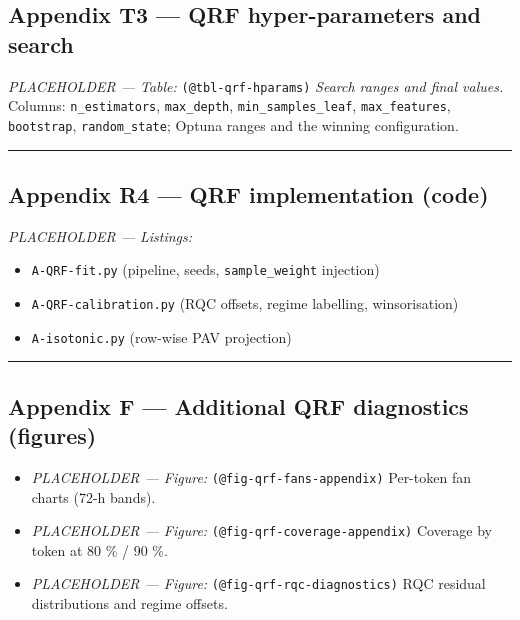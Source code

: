 \documentclass[
  a4paper,
  DIV=11,
  numbers=noendperiod]{scrreprt}
\providecommand{\tightlist}{%
  \setlength{\itemsep}{0pt}\setlength{\parskip}{0pt}}
\begin{document}
\subsection{Appendix T3 --- QRF hyper-parameters and
search}\label{app-t3-qrf-hparams}

\emph{PLACEHOLDER --- Table:} \texttt{(@tbl-qrf-hparams)} \emph{Search
ranges and final values.} Columns: \texttt{n\_estimators},
\texttt{max\_depth}, \texttt{min\_samples\_leaf},
\texttt{max\_features}, \texttt{bootstrap}, \texttt{random\_state};
Optuna ranges and the winning configuration.

\begin{center}\rule{0.5\linewidth}{0.5pt}\end{center}

\subsection{Appendix R4 --- QRF implementation
(code)}\label{app-r4-qrf-code}

\emph{PLACEHOLDER --- Listings:}

\begin{itemize}
\tightlist
\item
  \texttt{A-QRF-fit.py} (pipeline, seeds, \texttt{sample\_weight}
  injection)
\item
  \texttt{A-QRF-calibration.py} (RQC offsets, regime labelling,
  winsorisation)
\item
  \texttt{A-isotonic.py} (row-wise PAV projection)
\end{itemize}

\begin{center}\rule{0.5\linewidth}{0.5pt}\end{center}

\subsection{Appendix F --- Additional QRF diagnostics
(figures)}\label{appendix-f-additional-qrf-diagnostics-figures}

\begin{itemize}
\tightlist
\item
  \emph{PLACEHOLDER --- Figure:} \texttt{(@fig-qrf-fans-appendix)}
  Per-token fan charts (72-h bands).
\item
  \emph{PLACEHOLDER --- Figure:} \texttt{(@fig-qrf-coverage-appendix)}
  Coverage by token at 80 \% / 90 \%.
\item
  \emph{PLACEHOLDER --- Figure:} \texttt{(@fig-qrf-rqc-diagnostics)} RQC
  residual distributions and regime offsets.
\end{itemize}
\end{document}
